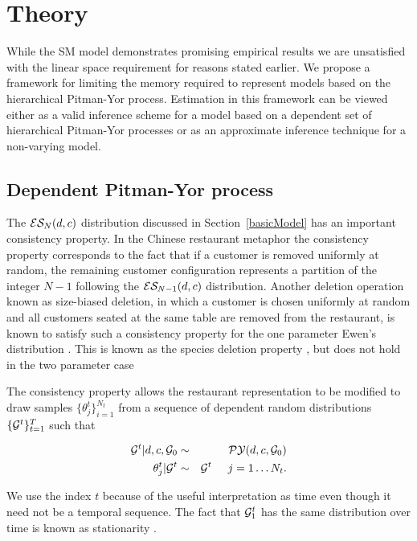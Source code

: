 \section{Theory}
\label{sec:theory}

While the SM model demonstrates promising empirical results \cite{Gasthaus} we are unsatisfied with the linear space requirement for reasons stated earlier.  We propose a framework for limiting the memory required to represent models based on the hierarchical Pitman-Yor process.  Estimation in this framework can be viewed either as a valid inference scheme for a model based on a dependent set of hierarchical Pitman-Yor processes or as an approximate inference technique for a non-varying model.

\subsection{Dependent Pitman-Yor process} 

The $\ES_N(d,c)$ distribution discussed in Section~\ref{basicModel} has an important consistency property. In the Chinese restaurant metaphor the consistency property corresponds to the fact that if a customer is removed uniformly at random, the remaining customer configuration represents a partition of the integer $N-1$ following the $\ES_{N-1}(d,c)$ distribution. Another deletion operation known as size-biased deletion, in which a customer is chosen uniformly at random and all customers seated at the same table are removed from the restaurant, is known to satisfy such a consistency property for the one parameter Ewen's distribution \cite{kingman}.  This is known as the species deletion property \cite{kingman}, but does not hold in the two parameter case \cite{pitman}

The consistency property allows the restaurant representation to be modified to draw samples  $\{ \theta_j^t \}_{i = 1}^{N_t}$ from a sequence of dependent random distributions $\{ \G^t \}_{t=1}^T$ such that 

\begin{eqnarray}
 \label{eqnDependentPY1}  \G^t | d, c, \G_0 &\sim& \PY(d,c,\G_0)\\
 \label{eqnDependentPY2}  \theta_j^t | \G^t &\sim& \G^t \hspace{.5cm} j = 1 \dots N_t.
 \end{eqnarray}
 
We use the index $t$ because of the useful interpretation as time even though it need not be a temporal sequence. The fact that $\G^t_1$ has the same distribution over time is known as stationarity \cite{davis and brockwel}.  
 
